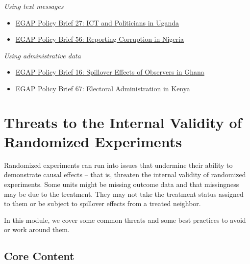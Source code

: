 \documentclass[12pt,]{book}
\begin{document}
\emph{Using text messages}

\begin{itemize}
\item
  \href{https://egap.org/resource/brief-27-ict-and-politicians-in-uganda/}{EGAP Policy Brief 27: ICT and Politicians in Uganda}
\item
  \href{https://egap.org/resource/reporting-corruption-in-nigeria-testing-the-effects-of-norms-nudges/}{EGAP Policy Brief 56: Reporting Corruption in Nigeria}
\end{itemize}

\emph{Using administrative data}

\begin{itemize}
\item
  \href{https://egap.org/resource/brief-16-spillover-effects-of-observers-in-ghana/}{EGAP Policy Brief 16: Spillover Effects of Observers in Ghana}
\item
  \href{https://egap.org/resource/electoral-administration-in-kenya/}{EGAP Policy Brief 67: Electoral Administration in Kenya}
\end{itemize}

\hypertarget{threats-to-the-internal-validity-of-randomized-experiments}{%
\chapter{Threats to the Internal Validity of Randomized Experiments}\label{threats-to-the-internal-validity-of-randomized-experiments}}

Randomized experiments can run into issues that undermine their ability to demonstrate causal effects -- that is, threaten the internal validity of randomized experiments. Some units might be missing outcome data and that missingness may be due to the treatment. They may not take the treatment status assigned to them or be subject to spillover effects from a treated neighbor.

In this module, we cover some common threats and some best practices to avoid or work around them.

\hypertarget{core-content-7}{%
\section{Core Content}\label{core-content-7}}
\end{document}
